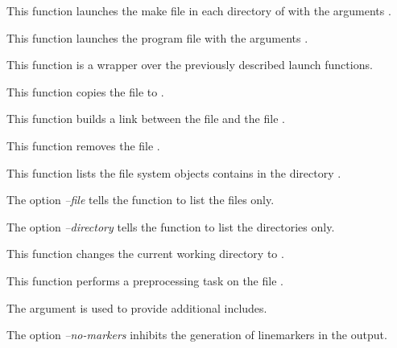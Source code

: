          {
	   This function launches the make file  in each
	   directory of  with the arguments
	   .
	 }

         {
	   This function launches the program file  with
	   the arguments .
	 }

         {
	   This function is a wrapper over the previously described
	   launch functions.
	 }

         {
	   This function copies the file  to
	   .
	 }

         {
	   This function builds a link between the file 
	   and the file .
	 }

         {
	   This function removes the file .
	 }

         {
	   This function lists the file system objects contains in the
	   directory .

	   The option \textit{--file} tells the function to list the
	   files only.

	   The option \textit{--directory} tells the function to list
	   the directories only.
	 }

         {
	   This function changes the current working directory to
	   .
	 }

         {
	   This function performs a preprocessing task on the file
	   .

	   The argument  is used to provide additional
	   includes.

	   The option \textit{--no-markers} inhibits the generation
	   of linemarkers in the output.
	 }

